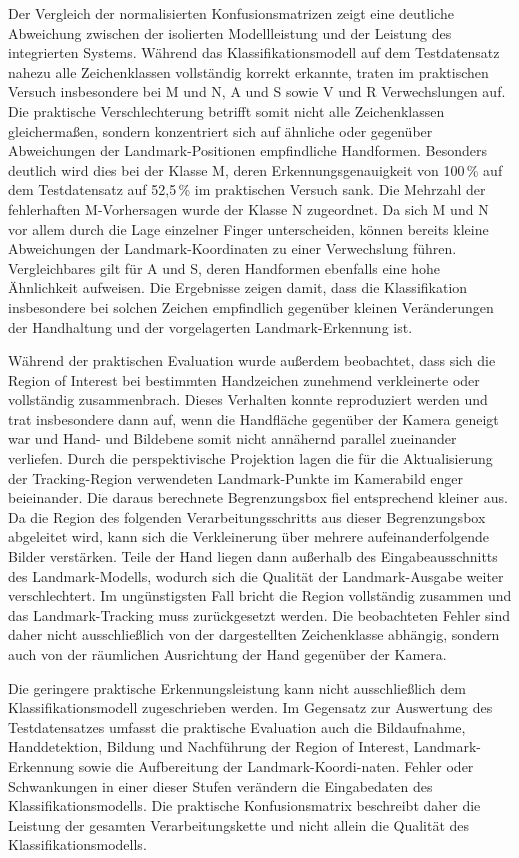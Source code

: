 Der Vergleich der normalisierten Konfusionsmatrizen zeigt eine deutliche Abweichung zwischen der isolierten Modellleistung und der Leistung des integrierten Systems. Während das Klassifikationsmodell auf dem Testdatensatz nahezu alle Zeichenklassen vollständig korrekt erkannte, traten im praktischen Versuch insbesondere bei M und N, A und S sowie V und R Verwechslungen auf. Die praktische Verschlechterung betrifft somit nicht alle Zeichenklassen gleichermaßen, sondern konzentriert sich auf ähnliche oder gegenüber Abweichungen der Landmark-Positionen empfindliche Handformen. Besonders deutlich wird dies bei der Klasse M, deren Erkennungsgenauigkeit von 100\,\% auf dem Testdatensatz auf 52,5\,\% im praktischen Versuch sank. Die Mehrzahl der fehlerhaften M-Vorhersagen wurde der Klasse N zugeordnet. Da sich M und N vor allem durch die Lage einzelner Finger unterscheiden, können bereits kleine Abweichungen der Landmark-Koordinaten zu einer Verwechslung führen. Vergleichbares gilt für A und S, deren Handformen ebenfalls eine hohe Ähnlichkeit aufweisen. Die Ergebnisse zeigen damit, dass die Klassifikation insbesondere bei solchen Zeichen empfindlich gegenüber kleinen Veränderungen der Handhaltung und der vorgelagerten Landmark-Erkennung ist. 

Während der praktischen Evaluation wurde außerdem beobachtet, dass sich die Region of Interest bei bestimmten Handzeichen zunehmend verkleinerte oder vollständig zusammenbrach. Dieses Verhalten konnte reproduziert werden und trat insbesondere dann auf, wenn die Handfläche gegenüber der Kamera geneigt war und Hand- und Bildebene somit nicht annähernd parallel zueinander verliefen. Durch die perspektivische Projektion \cite{alma990228578360206441} lagen die für die Aktualisierung der Tracking-Region verwendeten Landmark-Punkte im Kamerabild enger beieinander. Die daraus berechnete Begrenzungsbox fiel entsprechend kleiner aus. Da die Region des folgenden Verarbeitungsschritts aus dieser Begrenzungsbox abgeleitet wird, kann sich die Verkleinerung über mehrere aufeinanderfolgende Bilder verstärken. Teile der Hand liegen dann außerhalb des Eingabeausschnitts des Landmark-Modells, wodurch sich die Qualität der Landmark-Ausgabe weiter verschlechtert. Im ungünstigsten Fall bricht die Region vollständig zusammen und das Landmark-Tracking muss zurückgesetzt werden. Die beobachteten Fehler sind daher nicht ausschließlich von der dargestellten Zeichenklasse abhängig, sondern auch von der räumlichen Ausrichtung der Hand gegenüber der Kamera.

Die geringere praktische Erkennungsleistung kann nicht ausschließlich dem Klassifikationsmodell zugeschrieben werden. Im Gegensatz zur Auswertung des Testdatensatzes umfasst die praktische Evaluation auch die Bildaufnahme, Handdetektion, Bildung und Nachführung der Region of Interest, Landmark-Erkennung sowie die Aufbereitung der Landmark-Koordi-naten. Fehler oder Schwankungen in einer dieser Stufen verändern die Eingabedaten des Klassifikationsmodells. Die praktische Konfusionsmatrix beschreibt daher die Leistung der gesamten Verarbeitungskette und nicht allein die Qualität des Klassifikationsmodells.

